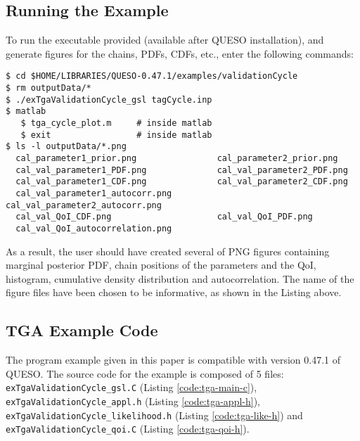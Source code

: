 \subsection{Running the Example}\label{sec:tga-run}

To run the executable provided (available after QUESO installation), and generate figures for the chains, PDFs, CDFs, etc., enter the following commands:
\begin{lstlisting}[label={},caption={}]
$ cd $HOME/LIBRARIES/QUESO-0.47.1/examples/validationCycle
$ rm outputData/*
$ ./exTgaValidationCycle_gsl tagCycle.inp    
$ matlab
   $ tga_cycle_plot.m     # inside matlab
   $ exit                 # inside matlab
$ ls -l outputData/*.png
  cal_parameter1_prior.png                cal_parameter2_prior.png                
  cal_val_parameter1_PDF.png              cal_val_parameter2_PDF.png              
  cal_val_parameter1_CDF.png              cal_val_parameter2_CDF.png              
  cal_val_parameter1_autocorr.png         cal_val_parameter2_autocorr.png
  cal_val_QoI_CDF.png                     cal_val_QoI_PDF.png
  cal_val_QoI_autocorrelation.png            
\end{lstlisting}


As a result, the user should have created several of PNG figures containing marginal posterior PDF, chain positions of the parameters and the QoI, histogram, cumulative density distribution and autocorrelation. The name of the figure files have been chosen to be informative, as shown in the Listing above.



\subsection{TGA Example Code}\label{sec:code-tga}



The program example given in this paper is compatible with version 0.47.1 of QUESO.
The source code for the example is composed of 5 files:
 \texttt{exTgaValidationCycle\_gsl.C} (Listing \ref{code:tga-main-c}),
 \texttt{exTgaValidationCycle\_appl.h} (Listing \ref{code:tga-appl-h}), 
 \texttt{exTgaValidationCycle\_likelihood.h}  (Listing \ref{code:tga-like-h}) and 
\texttt{exTgaValidationCycle\_qoi.C} (Listing \ref{code:tga-qoi-h}).





